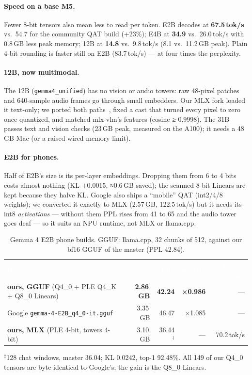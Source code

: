 \documentclass[10pt,letterpaper]{article}
\newcommand{\hd}[1]{\textcolor{white}{\interbold #1}}
\newcommand{\best}[1]{\textbf{#1}}
\newcommand{\repo}[1]{\texttt{\small #1}}
\begin{document}
\paragraph{Speed on a base M5.} Fewer 8-bit tensors also mean less to read per token. E2B decodes at \textbf{67.5\,tok/s} vs.\ 54.7 for the community QAT build (+23\%); E4B at \textbf{34.9} vs.\ 26.0\,tok/s with 0.8\,GB less peak memory; 12B at \textbf{14.8} vs.\ 9.8\,tok/s (8.1 vs.\ 11.2\,GB peak). Plain 4-bit rounding is faster still on E2B (83.7\,tok/s) --- at four times the perplexity.

\paragraph{12B, now multimodal.} The 12B (\texttt{gemma4\_unified}) has no vision or audio towers: raw 48-pixel patches and 640-sample audio frames go through small embedders. Our MLX fork loaded it text-only; we ported both paths~\cite{fork}, fixed a cast that turned every pixel to zero once quantized, and matched mlx-vlm's features (cosine ≥ 0.9998). The 31B passes text and vision checks (23\,GB peak, measured on the A100); it needs a 48\,GB Mac (or a raised wired-memory limit).

\paragraph{E2B for phones.} Half of E2B's size is its per-layer embeddings. Dropping them from 6 to 4 bits costs almost nothing (KL $+0.0015$, ≈0.6\,GB saved); the scanned 8-bit Linears are kept because they halve KL. Google also ships a ``mobile'' QAT (int2/4/8 weights); we converted it exactly to MLX (2.57\,GB, 122.5\,tok/s) but it needs its int8 \emph{activations} --- without them PPL rises from 41 to 65 and the audio tower goes deaf --- so it suits an NPU runtime, not MLX or llama.cpp.

\begin{table}[H]
\centering\small
\caption{Gemma 4 E2B phone builds. GGUF: llama.cpp, 32 chunks of 512, against our bf16 GGUF of the master (PPL 42.84).}
\begin{tabular}{lrrrr}
\rowcolor{thead}\hd{Build} & \hd{Size} & \hd{PPL} & \hd{vs.\ bf16} & \hd{Decode (M5)}\\
\textbf{ours, GGUF} (Q4\_0 + PLE Q4\_K + Q8\_0 Linears) & \best{2.86\,GB} & \best{42.24} & \best{×0.986} & --- \\
Google \repo{gemma-4-E2B\_q4\_0-it.gguf} & 3.35\,GB & 46.47 & ×1.085 & --- \\
\textbf{ours, MLX} (PLE 4-bit, towers 4-bit) & 3.10\,GB & 36.44$^{\ddagger}$ & --- & 70.2\,tok/s \\
\end{tabular}

\smallskip
\footnotesize $^{\ddagger}$128 chat windows, master 36.04; KL 0.0242, top-1 92.48\%. All 149 of our Q4\_0 tensors are byte-identical to Google's; the gain is the Q8\_0 Linears.
\end{table}
\end{document}
